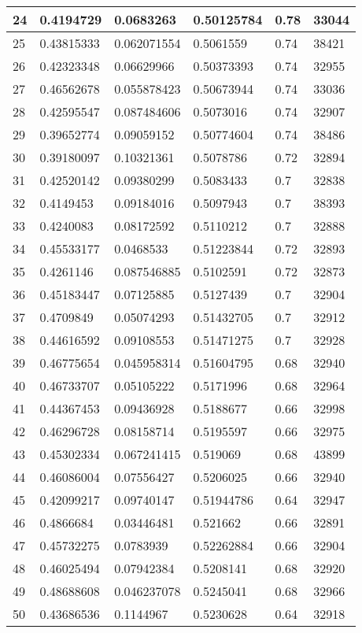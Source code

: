 \begin{longtable}{|l|l|l|l|l|l|}
24 & 0.4194729 & 0.0683263 & 0.50125784 & 0.78 & 33044 \\ \hline 
25 & 0.43815333 & 0.062071554 & 0.5061559 & 0.74 & 38421 \\ \hline 
26 & 0.42323348 & 0.06629966 & 0.50373393 & 0.74 & 32955 \\ \hline 
27 & 0.46562678 & 0.055878423 & 0.50673944 & 0.74 & 33036 \\ \hline 
28 & 0.42595547 & 0.087484606 & 0.5073016 & 0.74 & 32907 \\ \hline 
29 & 0.39652774 & 0.09059152 & 0.50774604 & 0.74 & 38486 \\ \hline 
30 & 0.39180097 & 0.10321361 & 0.5078786 & 0.72 & 32894 \\ \hline 
31 & 0.42520142 & 0.09380299 & 0.5083433 & 0.7 & 32838 \\ \hline 
32 & 0.4149453 & 0.09184016 & 0.5097943 & 0.7 & 38393 \\ \hline 
33 & 0.4240083 & 0.08172592 & 0.5110212 & 0.7 & 32888 \\ \hline 
34 & 0.45533177 & 0.0468533 & 0.51223844 & 0.72 & 32893 \\ \hline 
35 & 0.4261146 & 0.087546885 & 0.5102591 & 0.72 & 32873 \\ \hline 
36 & 0.45183447 & 0.07125885 & 0.5127439 & 0.7 & 32904 \\ \hline 
37 & 0.4709849 & 0.05074293 & 0.51432705 & 0.7 & 32912 \\ \hline 
38 & 0.44616592 & 0.09108553 & 0.51471275 & 0.7 & 32928 \\ \hline 
39 & 0.46775654 & 0.045958314 & 0.51604795 & 0.68 & 32940 \\ \hline 
40 & 0.46733707 & 0.05105222 & 0.5171996 & 0.68 & 32964 \\ \hline 
41 & 0.44367453 & 0.09436928 & 0.5188677 & 0.66 & 32998 \\ \hline 
42 & 0.46296728 & 0.08158714 & 0.5195597 & 0.66 & 32975 \\ \hline 
43 & 0.45302334 & 0.067241415 & 0.519069 & 0.68 & 43899 \\ \hline 
44 & 0.46086004 & 0.07556427 & 0.5206025 & 0.66 & 32940 \\ \hline 
45 & 0.42099217 & 0.09740147 & 0.51944786 & 0.64 & 32947 \\ \hline 
46 & 0.4866684 & 0.03446481 & 0.521662 & 0.66 & 32891 \\ \hline 
47 & 0.45732275 & 0.0783939 & 0.52262884 & 0.66 & 32904 \\ \hline 
48 & 0.46025494 & 0.07942384 & 0.5208141 & 0.68 & 32920 \\ \hline 
49 & 0.48688608 & 0.046237078 & 0.5245041 & 0.68 & 32966 \\ \hline 
50 & 0.43686536 & 0.1144967 & 0.5230628 & 0.64 & 32918 \\ \hline 
\end{longtable}